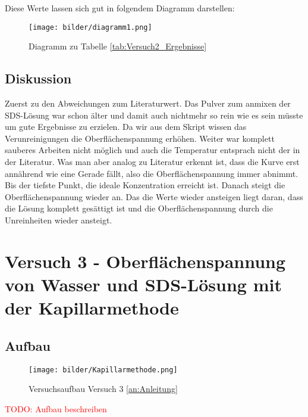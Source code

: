             Diese Werte lassen sich gut in folgendem Diagramm darstellen:

            \begin{figure}[H]
                \centering
                \caption{Diagramm zu Tabelle \ref{tab:Versuch2_Ergebnisse}}
                \label{fig:versuch2}
                \texttt{[image: bilder/diagramm1.png]}
            \end{figure}

        \subsection{Diskussion}
            
            Zuerst zu den Abweichungen zum Literaturwert. Das Pulver zum anmixen der SDS-Lösung war schon älter und damit auch nichtmehr so rein wie es sein müsste um gute Ergebnisse zu erzielen. Da wir aus dem Skript wissen das Verunreinigungen die Oberflächenspannung erhöhen. Weiter war komplett sauberes Arbeiten nicht möglich und auch die Temperatur entsprach nicht der in der Literatur. Was man aber analog zu Literatur erkennt ist, dass die Kurve erst annährend wie eine Gerade fällt, also die Oberflächenspannung immer abnimmt. Bis der tiefste Punkt, die ideale Konzentration erreicht ist. Danach steigt die Oberflächenspannung wieder an. Das die Werte wieder ansteigen liegt daran, dass die Lösung komplett gesättigt ist und die Oberflächenspannung durch die Unreinheiten wieder ansteigt.

    \section{Versuch 3 - Oberflächenspannung von Wasser und SDS-Lösung mit der Kapillarmethode}

        \subsection{Aufbau}

            \begin{figure}[H]
                \centering
                \texttt{[image: bilder/Kapillarmethode.png]}
                \caption{Versuchsaufbau Versuch 3 \ref{an:Anleitung}}
                \label{fig:Versuch3_Aufbau}
            \end{figure}

            \textcolor{red}{TODO: Aufbau beschreiben}

